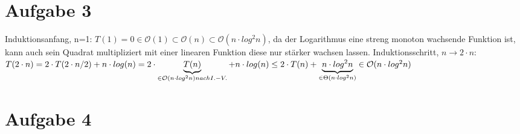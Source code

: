 \documentclass[a4paper,10pt,oneside,leqno]{scrartcl}
\begin{document}
\section*{Aufgabe 3}
Induktionsanfang, n=1:\newline
$T(1) = 0 \in \mathcal{O}(1) \subset \mathcal{O}(n) \subset \mathcal{O}(n\cdot log^2 n)$, da der Logarithmus eine streng monoton wachsende
Funktion ist, kann auch sein Quadrat multipliziert mit einer linearen Funktion diese nur stärker wachsen lassen.\newline
Induktionsschritt, $n\rightarrow 2\cdot n$:\newline
$T(2\cdot n) = 2\cdot T(2\cdot n/2)+n\cdot log(n) = 2\cdot \underbrace{T(n)}_{\in \mathcal{O}(n\cdot log^2 n)\newline nach I.-V.}+n\cdot log(n)
\leq 2\cdot T(n) + \underbrace{n\cdot log^2 n}_{\in \Theta(n\cdot log^2 n)}\in \mathcal{O}(n\cdot log^2 n)$
\section*{Aufgabe 4}
\end{document}
